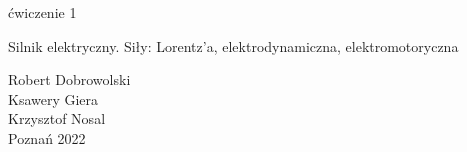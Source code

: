 \begin{titlepage}
\begin{center}
  ćwiczenie 1

	\vspace*{4mm}
	\fontsize{22pt}{22pt}\selectfont
Silnik elektryczny. Siły: Lorentz'a, elektrodynamiczna, elektromotoryczna
	\vspace*{8mm}
	\fontsize{16pt}{16pt}\selectfont

Robert Dobrowolski\\
Ksawery Giera\\
Krzysztof Nosal\\

 \fontsize{16pt}{16pt}\selectfont
	\vspace*{15mm}
	Poznań 2022
	\end{center}
\end{titlepage}
